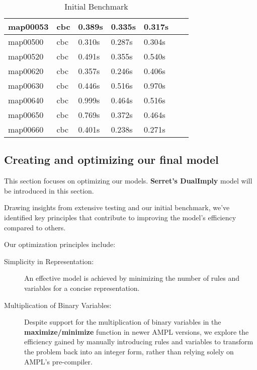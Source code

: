 \begin{table}[H]
\begin{tabular}{|l|l|l|l|l|l|l|}
map00053 & cbc & 0.389s         & 0.335s      & 0.317s       \\\hline
map00500 & cbc & 0.310s          & 0.287s      & 0.304s      \\\hline
map00520 & cbc & 0.491s          & 0.355s       & 0.540s       \\\hline
map00620 & cbc & 0.357s           & 0.246s      & 0.406s       \\\hline
map00630 & cbc & 0.446s          & 0.516s        & 0.970s       \\\hline
map00640 & cbc & 0.999s          & 0.464s       & 0.516s       \\\hline
map00650 & cbc & 0.769s          & 0.372s       & 0.464s       \\\hline
map00660 & cbc & 0.401s          & 0.238s      & 0.271s      \\\hline
\end{tabular}
\caption{Initial Benchmark}
\label{tab:initial_benchmark}
\end{table}

\subsection{Creating and optimizing our final model} \label{sec:model_dualimply_extra_restrictions}

This section focuses on optimizing our models. \textbf{Serret's DualImply} model will be introduced in this section. 

Drawing insights from extensive testing and our initial benchmark, we've identified key principles that contribute to improving the model's efficiency compared to others.

Our optimization principles include:

\begin{description}
    \item[Simplicity in Representation:]
        An effective model is achieved by minimizing the number of rules and variables for a concise representation.

     \item[Multiplication of Binary Variables:]
        Despite support for the multiplication of binary variables in the \textbf{maximize/minimize} function in newer AMPL versions, we explore the efficiency gained by manually introducing rules and variables to transform the problem back into an integer form, rather than relying solely on AMPL's pre-compiler.
\end{description}

